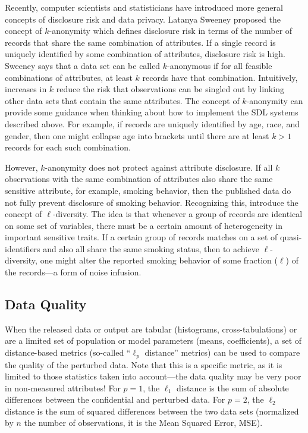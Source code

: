 Recently, computer scientists and statisticians have introduced more general concepts of disclosure risk and data privacy. Latanya Sweeney proposed the concept of \(k\)-anonymity \citep{sweeney_achieving_2002} which defines disclosure risk in terms of the number of records that share the same combination of attributes. If a single record is uniquely identified by some combination of attributes, disclosure risk is high. Sweeney says that a data set can be called \(k\)-anonymous if for all feasible combinations of attributes, at least \(k\) records have that combination. Intuitively, increases in \(k\) reduce the risk that observations can be singled out by linking other data sets that contain the same attributes. The concept of \(k\)-anonymity can provide some guidance when thinking about how to implement the SDL systems described above. For example, if records are uniquely identified by age, race, and gender, then one might collapse age into brackets until there are at least \(k>1\) records for each such combination.

However, \(k\)-anonymity does not protect against attribute disclosure. If all \(k\) observations with the same combination of attributes also share the same sensitive attribute, for example, smoking behavior, then the published data do not fully prevent disclosure of smoking behavior. Recognizing this, \citet{machanavajjhala_l-diversity_2007} introduce the concept of \(\ell\)-diversity. The idea is that whenever a group of records are identical on some set of variables, there must be a certain amount of heterogeneity in important sensitive traits. If a certain group of records matches on a set of quasi-identifiers and also all share the same smoking status, then to achieve \(\ell\)-diversity, one might alter the reported smoking behavior of some fraction (\(\ell\)) of the records---a form of noise infusion.

\hypertarget{data-quality}{%
\subsection{Data Quality}\label{data-quality}}

When the released data or output are tabular (histograms, cross-tabulations) or are a limited set of population or model parameters (means, coefficients), a set of distance-based metrics (so-called ``\(\ell_p\) distance'' metrics) can be used to compare the quality of the perturbed data. Note that this is a specific metric, as it is limited to those statistics taken into account---the data quality may be very poor in non-measured attributes! For \(p=1\), the \(\ell_1\) distance is the sum of absolute differences between the confidential and perturbed data. For \(p = 2\), the \(\ell_2\) distance is the sum of squared differences between the two data sets (normalized by \(n\) the number of observations, it is the Mean Squared Error, MSE).

